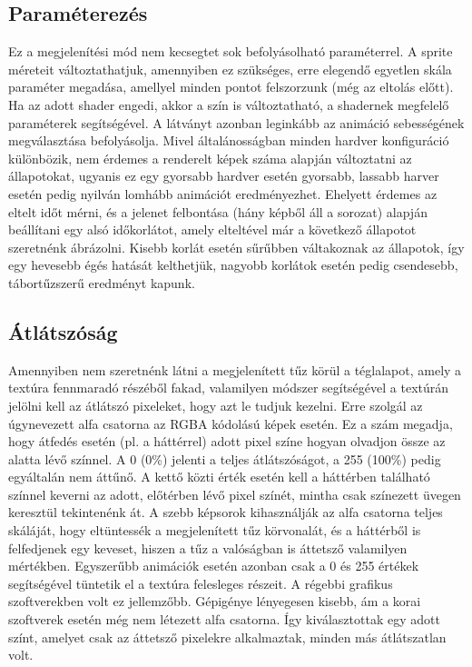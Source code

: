 \subsection{Paraméterezés}
Ez a megjelenítési mód nem kecsegtet sok befolyásolható paraméterrel. A sprite méreteit változtathatjuk, amennyiben ez szükséges, erre elegendő egyetlen skála paraméter megadása, amellyel minden pontot felszorzunk (még az eltolás előtt). Ha az adott shader engedi, akkor a szín is változtatható, a shadernek megfelelő paraméterek segítségével. A látványt azonban leginkább az animáció sebességének megválasztása befolyásolja. Mivel általánosságban minden hardver konfiguráció különbözik, nem érdemes a renderelt képek száma alapján változtatni az állapotokat, ugyanis ez egy gyorsabb hardver esetén gyorsabb, lassabb harver esetén pedig nyilván lomhább animációt eredményezhet. Ehelyett érdemes az eltelt időt mérni, és a jelenet felbontása (hány képből áll a sorozat) alapján beállítani egy alsó időkorlátot, amely elteltével már a következő állapotot szeretnénk ábrázolni. Kisebb korlát esetén sűrűbben váltakoznak az állapotok, így egy hevesebb égés hatását kelthetjük, nagyobb korlátok esetén pedig csendesebb, tábortűzszerű eredményt kapunk.

\subsection{Átlátszóság}
Amennyiben nem szeretnénk látni a megjelenített tűz körül a téglalapot, amely a textúra fennmaradó részéből fakad, valamilyen módszer segítségével a textúrán jelölni kell az átlátszó pixeleket, hogy azt le tudjuk kezelni. Erre szolgál az úgynevezett alfa csatorna az RGBA kódolású képek esetén. Ez a szám megadja, hogy átfedés esetén (pl. a háttérrel) adott pixel színe hogyan olvadjon össze az alatta lévő színnel.  A 0 (0\%) jelenti a teljes átlátszóságot, a 255 (100\%) pedig egyáltalán nem áttűnő. A kettő közti érték esetén kell a háttérben található színnel keverni az adott, előtérben lévő pixel színét, mintha csak színezett üvegen keresztül tekintenénk át. A szebb képsorok kihasználják az alfa csatorna teljes skáláját, hogy eltüntessék a megjelenített tűz körvonalát, és a háttérből is felfedjenek egy keveset, hiszen a tűz a valóságban is áttetsző valamilyen mértékben. Egyszerűbb animációk esetén azonban csak a 0 és 255 értékek segítségével tüntetik el a textúra felesleges részeit. A régebbi grafikus szoftverekben volt ez jellemzőbb. Gépigénye lényegesen kisebb, ám a korai szoftverek esetén még nem létezett alfa csatorna. Így kiválasztottak egy adott színt, amelyet csak az áttetsző pixelekre alkalmaztak, minden más átlátszatlan volt.

